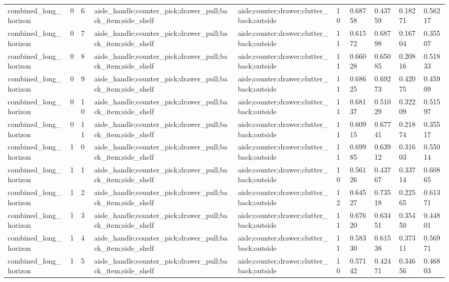\documentclass{article}
\begin{document}
\begin{table}[tbp]
{\begin{tabular}{llllllllll}
combined\_long\_horizon & 0 & 6 & aisle\_handle;counter\_pick;drawer\_pull;back\_item;side\_shelf & aisle;counter;drawer;clutter\_back;outside & 10 & 0.68758 & 0.43759 & 0.18271 & 0.56217 \\
combined\_long\_horizon & 0 & 7 & aisle\_handle;counter\_pick;drawer\_pull;back\_item;side\_shelf & aisle;counter;drawer;clutter\_back;outside & 11 & 0.61572 & 0.68798 & 0.16704 & 0.35507 \\
combined\_long\_horizon & 0 & 8 & aisle\_handle;counter\_pick;drawer\_pull;back\_item;side\_shelf & aisle;counter;drawer;clutter\_back;outside & 11 & 0.66028 & 0.65085 & 0.20816 & 0.51833 \\
combined\_long\_horizon & 0 & 9 & aisle\_handle;counter\_pick;drawer\_pull;back\_item;side\_shelf & aisle;counter;drawer;clutter\_back;outside & 11 & 0.68625 & 0.69273 & 0.42075 & 0.45909 \\
combined\_long\_horizon & 0 & 10 & aisle\_handle;counter\_pick;drawer\_pull;back\_item;side\_shelf & aisle;counter;drawer;clutter\_back;outside & 11 & 0.68137 & 0.51029 & 0.32209 & 0.51597 \\
combined\_long\_horizon & 0 & 11 & aisle\_handle;counter\_pick;drawer\_pull;back\_item;side\_shelf & aisle;counter;drawer;clutter\_back;outside & 11 & 0.60915 & 0.67741 & 0.21874 & 0.35517 \\
combined\_long\_horizon & 1 & 0 & aisle\_handle;counter\_pick;drawer\_pull;back\_item;side\_shelf & aisle;counter;drawer;clutter\_back;outside & 11 & 0.69985 & 0.63912 & 0.31603 & 0.55014 \\
combined\_long\_horizon & 1 & 1 & aisle\_handle;counter\_pick;drawer\_pull;back\_item;side\_shelf & aisle;counter;drawer;clutter\_back;outside & 10 & 0.56126 & 0.43767 & 0.33714 & 0.60865 \\
combined\_long\_horizon & 1 & 2 & aisle\_handle;counter\_pick;drawer\_pull;back\_item;side\_shelf & aisle;counter;drawer;clutter\_back;outside & 12 & 0.64527 & 0.73518 & 0.22565 & 0.61371 \\
combined\_long\_horizon & 1 & 3 & aisle\_handle;counter\_pick;drawer\_pull;back\_item;side\_shelf & aisle;counter;drawer;clutter\_back;outside & 11 & 0.67620 & 0.63451 & 0.35450 & 0.44801 \\
combined\_long\_horizon & 1 & 4 & aisle\_handle;counter\_pick;drawer\_pull;back\_item;side\_shelf & aisle;counter;drawer;clutter\_back;outside & 11 & 0.58330 & 0.61538 & 0.37311 & 0.56971 \\
combined\_long\_horizon & 1 & 5 & aisle\_handle;counter\_pick;drawer\_pull;back\_item;side\_shelf & aisle;counter;drawer;clutter\_back;outside & 10 & 0.57142 & 0.42471 & 0.34656 & 0.46803 \\

\end{tabular}}
\end{table}
\end{document}
